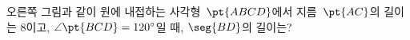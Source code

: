 \noindent\begin{minipage}[t]{0.58\linewidth}\vspace{0pt}\raggedright 오른쪽 그림과 같이 원에 내접하는 사각형~$\pt{ABCD}$에서 지름~$\pt{AC}$의 길이는 8이고, $\angle\pt{BCD}=120^\circ$일 때, $\seg{BD}$의 길이는?\end{minipage}\hfill\begin{minipage}[t]{0.4\linewidth}\vspace{0pt}\centering \resizebox{\ifdim\width>\linewidth\linewidth\else\width\fi}{!}{}\end{minipage}\par
{}
